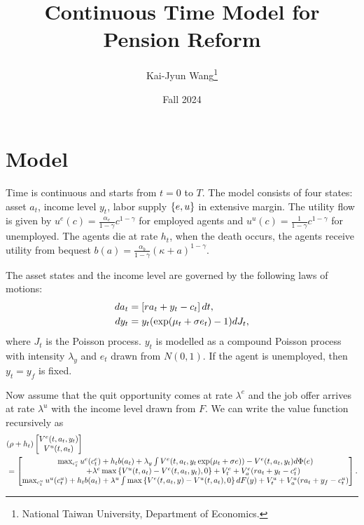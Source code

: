 \documentclass[a4paper, 12pt]{article}
\title{Continuous Time Model for Pension Reform}
\author{Kai-Jyun Wang\thanks{National Taiwan University, Department of Economics.}}
\date{Fall 2024}
\begin{document}
 
\maketitle

\section{Model}

Time is continuous and starts from $t = 0$ to $T$. The model consists of four states: asset 
$a_t$, income level $y_t$, labor supply $\left\{ {e,u} \right\}$ in extensive margin. The utility flow is 
given by $u^e(c) = \frac{\alpha_e}{1-\gamma}c^{1-\gamma}$ for employed agents and 
$u^u(c) = \frac{1}{1-\gamma}c^{1-\gamma}$ for unemployed. The agents die at rate $h_t$, when 
the death occurs, the agents receive utility from bequest $b(a) = \frac{\alpha_b}{1-\gamma}
(\kappa + a)^{1-\gamma}$.

The asset states and the income level are governed by the following laws of 
motions: 
\begin{align}
    da_t &= \left[ {ra_t + y_t - c_t} \right]dt, \\
    dy_t &= y_t(\exp(\mu_t + \sigma e_t) - 1)dJ_t, 
\end{align}
where $J_t$ is the Poisson process. $y_t$ is modelled as a compound Poisson 
process with intensity $\lambda_y$ and $e_t$ drawn from $N(0,1)$. If the agent 
is unemployed, then $y_t = y_f$ is fixed. 

Now assume that the quit opportunity comes at rate $\lambda^e$ and the job offer 
arrives at rate $\lambda^u$ with the income level drawn from $F$. We can write the 
value function recursively as
\begin{equation}\label{eq:value}
    \begin{split}
        &(\rho + h_t)\begin{bmatrix}
        V^e(t, a_t, y_t) \\
        V^u(t, a_t) \\
        \end{bmatrix} \\
        &= \begin{bmatrix}
            \max_{c_t^e} u^e(c_t^e) + h_tb(a_t) + \lambda_y\int V^e(t, a_t, y_t\exp(\mu_t + \sigma e)) - V^e(t, a_t, y_t) d\Phi(e) \\
            \qquad+ \lambda^e\max\left\{ {V^u(t, a_t) - V^e(t, a_t, y_t), 0} \right\} + V_t^e + V_a^e(ra_t + y_t - c_t^e) \\
            \max_{c_t^u} u^u(c_t^u) + h_tb(a_t) + \lambda^u\int \max\left\{ {V^e(t, a_t, y) - V^u(t, a_t), 0} \right\}dF(y) + V_t^u + V_a^u(ra_t + y_f - c_t^u) \\
        \end{bmatrix}.
    \end{split}
\end{equation}
\end{document}

